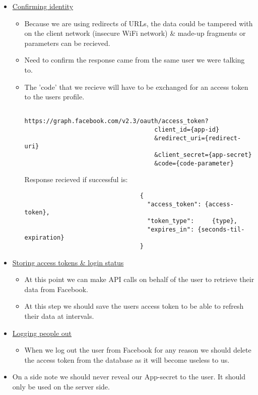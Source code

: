 \documentclass{article}
\begin{document}
\begin{itemize}
				\item \href{https://developers.facebook.com/docs/facebook-login/manually-build-a-login-flow#confirm}{Confirming identity}
					\begin{itemize}
						\item Because we are using redirects of URLs, the data could be tampered with on the client network (insecure WiFi network) \& made-up fragments or parameters can be recieved.
						\item Need to confirm the response came from the same user we were talking to.
						\item The 'code' that we recieve will have to be exchanged for an access token to the users profile.
							\begin{verbatim}
								https://graph.facebook.com/v2.3/oauth/access_token?
    								client_id={app-id}
   									&redirect_uri={redirect-uri}
   									&client_secret={app-secret}
   									&code={code-parameter}
							\end{verbatim}
						Response recieved if successful is:
							\begin{verbatim}
								{
								  "access_token": {access-token}, 
								  "token_type": 	{type},
								  "expires_in":	{seconds-til-expiration}
								}
							\end{verbatim}
					\end{itemize}
				\item \href{https://developers.facebook.com/docs/facebook-login/manually-build-a-login-flow#token}{Storing access tokens \& login status}
					\begin{itemize}
						\item At this point we can make API calls on behalf of the user to retrieve their data from Facebook.
						\item At this step we should save the users access token to be able to refresh their data at intervals.
					\end{itemize}
				\item \href{https://developers.facebook.com/docs/facebook-login/manually-build-a-login-flow#logout}{Logging people out}
					\begin{itemize}
						\item When we log out the user from Facebook for any reason we should delete the access token from the database as it will become useless to us.
					\end{itemize}
				\item On a side note we should never reveal our App-secret to the user. It should only be used on the server side.
			\end{itemize}
\end{document}
